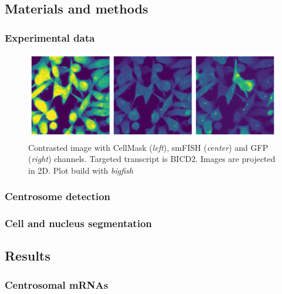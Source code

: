\subsection{Materials and methods}
\label{subsec:materials_centrosomal}

\subsubsection{Experimental data}

\begin{figure}[h]
    \centering
    \includegraphics[width=\textwidth]{figures/chapter5/FoV_BICD2}
    \caption{Contrasted image with CellMask\textsuperscript{\texttrademark} (\textit{left}), smFISH (\textit{center}) and GFP (\textit{right}) channels.
	Targeted transcript is BICD2.
	Images are projected in 2D.
	Plot build with \emph{bigfish}}
    \label{fig:fov_adham}
\end{figure}

\subsubsection{Centrosome detection}

\subsubsection{Cell and nucleus segmentation}

\subsection{Results}
\label{subsec:results_centrosomal}

\subsubsection{Centrosomal mRNAs}

